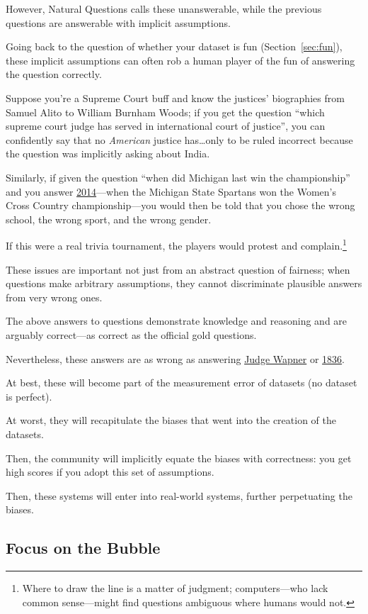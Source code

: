 However, Natural Questions calls these unanswerable, while the previous questions are answerable with implicit assumptions.

Going back to the question of whether your dataset is fun (Section~\ref{sec:fun}), these implicit assumptions can often rob a human player of the fun of answering the question correctly.

Suppose you're a  Supreme Court buff and know the justices' biographies from Samuel Alito to William Burnham Woods; if you get the question ``which supreme court judge has served in international court of justice'', you can confidently say that no \emph{American} justice has\dots only to be ruled incorrect because the question was implicitly asking about India.

Similarly, if given the question ``when did Michigan last win the championship'' and you answer \underline{2014}---when the Michigan State Spartans won the Women's Cross Country championship---you would then be told that you chose the wrong school, the wrong sport, and the wrong gender.

If this were a real trivia tournament, the players would protest and complain.\footnote{Where to draw the line is a matter of judgment; computers---who lack common sense---might find questions ambiguous where humans would not.}

These issues are important not just from an abstract question of fairness; when questions make arbitrary assumptions, they cannot discriminate plausible answers from very wrong ones.

The above answers to questions demonstrate knowledge and reasoning and are arguably correct---as correct as the official gold questions.

Nevertheless, these answers are as wrong as answering \underline{Judge Wapner} or \underline{1836}.

At best, these will become part of the measurement error of datasets (no dataset is perfect). 

At worst, they will recapitulate the biases that went into the creation of the datasets.

Then, the community will implicitly equate the biases with correctness: you get high scores if you adopt this set of assumptions.

Then, these systems will enter into real-world systems, further perpetuating the biases.

\subsection{Focus on the Bubble}

